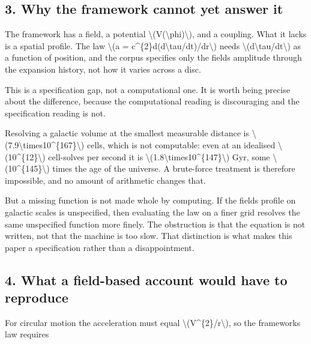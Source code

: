 \documentclass[
  10pt,
]{article}
\begin{document}
\hypertarget{why-the-framework-cannot-yet-answer-it}{%
\subsection{3. Why the framework cannot yet answer
it}\label{why-the-framework-cannot-yet-answer-it}}

The framework has a field, a potential
\textbackslash(V(\textbackslash phi)\textbackslash), and a coupling.
What it lacks is a spatial profile. The law \textbackslash(a =
c\^{}\{2\}d(d\textbackslash tau/dt)/dr\textbackslash) needs
\textbackslash(d\textbackslash tau/dt\textbackslash) as a function of
position, and the corpus specifies only the field\textquotesingle s
amplitude through the expansion history, not how it varies across a
disc.

This is a specification gap, not a computational one. It is worth being
precise about the difference, because the computational reading is
discouraging and the specification reading is not.

Resolving a galactic volume at the smallest measurable distance is
\textbackslash(7.9\textbackslash times10\^{}\{167\}\textbackslash)
cells, which is not computable: even at an idealised
\textbackslash(10\^{}\{12\}\textbackslash) cell-solves per second it is
\textbackslash(1.8\textbackslash times10\^{}\{147\}\textbackslash) Gyr,
some \textbackslash(10\^{}\{145\}\textbackslash) times the age of the
universe. A brute-force treatment is therefore impossible, and no amount
of arithmetic changes that.

But a missing function is not made whole by computing. If the
field\textquotesingle s profile on galactic scales is unspecified, then
evaluating the law on a finer grid resolves the same unspecified
function more finely. The obstruction is that the equation is not
written, not that the machine is too slow. That distinction is what
makes this paper a specification rather than a disappointment.

\hypertarget{what-a-field-based-account-would-have-to-reproduce}{%
\subsection{4. What a field-based account would have to
reproduce}\label{what-a-field-based-account-would-have-to-reproduce}}

For circular motion the acceleration must equal
\textbackslash(V\^{}\{2\}/r\textbackslash), so the
framework\textquotesingle s law requires
\end{document}
